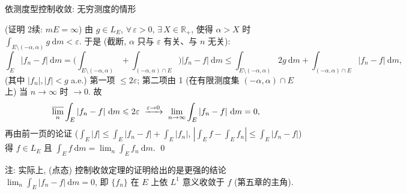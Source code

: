 \begin{frame}{依测度型控制收敛: 无穷测度的情形}

\startproof[bg=yellow, fg=red](证明 2\textdegree 续: $mE = \infty$)
由 $g \in L_E$, $\forall\, \varepsilon > 0$, $\exists\, X \in \mathbb{R}_+$, 使得
$\alpha > X$ 时 $\int_{E \setminus (-\alpha, \alpha)} g ~ \mathrm{d} m < \varepsilon$.
于是 (截断, $\alpha$ 只与 $\varepsilon$ 有关、与 $n$ 无关):
\[
\int_E |f_n - f| ~ \mathrm{d} m
= \Big( \int_{E \setminus (-\alpha, \alpha)} + \int_{(-\alpha, \alpha) \cap E} \Big) |f_n - f| ~ \mathrm{d} m
\leqslant \int_{E \setminus (-\alpha, \alpha)} 2 g ~ \mathrm{d} m
+ \int_{(-\alpha, \alpha) \cap E} |f_n - f| ~ \mathrm{d} m ,
\]
(其中 $|f_n|, |f| < g$ a.e.) 第一项 $\leqslant 2\varepsilon$; 第二项由 1\textdegree
(在有限测度集 $(-\alpha, \alpha) \cap E$ 上) 当 $n \to \infty$ 时 $\to 0$. 故
\[
\varlimsup_n \int_E |f_n - f| ~ \mathrm{d} m \leqslant 2\varepsilon
\ \xrightarrow{\varepsilon \to 0}\
\lim_{n \to \infty} \int_E |f_n - f| ~ \mathrm{d} m = 0 ,
\]
再由前一页的论证 ($\int_E |f| \leqslant \int_E |f_n - f| + \int_E |f_n|$,
$|\int_E f - \int_E f_n| \leqslant \int_E |f_n - f|$) 得
$f \in L_E$ 且 $\int_E f ~ \mathrm{d} m = \lim_n \int_E f_n ~ \mathrm{d} m$. \qed

\pause

\begin{attnblock}
注: 实际上, (点态) 控制收敛定理的证明给出的是\alert{更强}的结论
$\lim_n \int_E |f_n - f| ~ \mathrm{d} m = 0$,
即 $\{f_n\}$ 在 $E$ 上\alert{依 $L^1$ 意义}收敛于 $f$ (第五章的主角).
\end{attnblock}

\end{frame}





